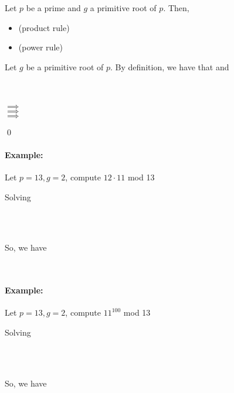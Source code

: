 \documentclass[../main.tex]{subfiles}
\begin{document}
\begin{thm}
    Let $p$ be a prime and $g$ a primitive root of $p$. Then,
    \begin{itemize}
        \item {} (product rule)
        \item {} (power rule)
    \end{itemize}
\end{thm}
\begin{pf}
    Let $g$ be a primitive root of $p$. By definition, we have that  and  \sspace
    \begin{center}
         \\
         \\
        $\implies{}$  \\
        $\implies{}$  \\
        $\implies{}$ 
    \end{center} \qed
\end{pf}
\newpage
\paragraph{Example:} Let $p=13,g=2$, compute $12 \cdot 11$ mod 13
\begin{ans}
    Solving 
    \begin{center}
         \\
         \\
    \end{center}
    So, we have
    \begin{center}
         \\
    \end{center}
\end{ans}

\paragraph{Example:} Let $p=13,g=2$, compute $11^{100}$ mod 13
\begin{ans}
    Solving 
    \begin{center}
         \\
         \\
    \end{center}
    So, we have
    \begin{center}
         \\
         \\
    \end{center}
\end{ans}
\end{document}
